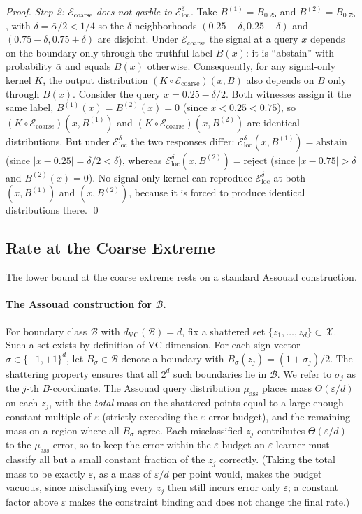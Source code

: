 \documentclass[runningheads,envcountsame]{llncs}
\newcommand{\cB}{\mathcal{B}}
\newcommand{\cX}{\mathcal{X}}
\newcommand{\cE}{\mathcal{E}}
\newcommand{\eps}{\varepsilon}
\newcommand{\dvc}{d_{\mathrm{VC}}}
\begin{document}
\begin{proof}
\emph{Step 2: $\cE_{\mathrm{coarse}}$ does not garble to $\cE_{\mathrm{loc}}^\delta$.}
Take $B^{(1)} = B_{0.25}$ and $B^{(2)} = B_{0.75}$, with $\delta = \bar\alpha/2 < 1/4$ so the $\delta$-neighborhoods $(0.25 - \delta, 0.25 + \delta)$ and $(0.75 - \delta, 0.75 + \delta)$ are disjoint. Under $\cE_{\mathrm{coarse}}$ the signal at a query $x$ depends on the boundary only through the truthful label $B(x)$: it is ``abstain'' with probability $\bar\alpha$ and equals $B(x)$ otherwise. Consequently, for any signal-only kernel $K$, the output distribution $(K \circ \cE_{\mathrm{coarse}})(x, B)$ also depends on $B$ only through $B(x)$. Consider the query $x = 0.25 - \delta/2$. Both witnesses assign it the same label, $B^{(1)}(x) = B^{(2)}(x) = 0$ (since $x < 0.25 < 0.75$), so $(K \circ \cE_{\mathrm{coarse}})(x, B^{(1)})$ and $(K \circ \cE_{\mathrm{coarse}})(x, B^{(2)})$ are identical distributions. But under $\cE_{\mathrm{loc}}^\delta$ the two responses differ: $\cE_{\mathrm{loc}}^\delta(x, B^{(1)}) = \text{abstain}$ (since $|x - 0.25| = \delta/2 < \delta$), whereas $\cE_{\mathrm{loc}}^\delta(x, B^{(2)}) = \text{reject}$ (since $|x - 0.75| > \delta$ and $B^{(2)}(x) = 0$). No signal-only kernel can reproduce $\cE_{\mathrm{loc}}^\delta$ at both $(x, B^{(1)})$ and $(x, B^{(2)})$, because it is forced to produce identical distributions there. \qed
\end{proof}

\subsection{Rate at the Coarse Extreme}
\label{sec:coarse-rate}

The lower bound at the coarse extreme rests on a standard Assouad construction.

\paragraph{The Assouad construction for $\cB$.}
\label{app:assouad-construction}
For boundary class $\cB$ with $\dvc(\cB) = d$, fix a shattered set $\{z_1, \ldots, z_d\} \subset \cX$. Such a set exists by definition of VC dimension. For each sign vector $\sigma \in \{-1, +1\}^d$, let $B_\sigma \in \cB$ denote a boundary with $B_\sigma(z_j) = (1 + \sigma_j)/2$. The shattering property ensures that all $2^d$ such boundaries lie in $\cB$. We refer to $\sigma_j$ as the $j$-th $B$-coordinate. The Assouad query distribution $\mu_{\mathrm{ass}}$ places mass $\Theta(\eps/d)$ on each $z_j$, with the \emph{total} mass on the shattered points equal to a large enough constant multiple of $\eps$ (strictly exceeding the $\eps$ error budget), and the remaining mass on a region where all $B_\sigma$ agree. Each misclassified $z_j$ contributes $\Theta(\eps/d)$ to the $\mu_{\mathrm{ass}}$-error, so to keep the error within the $\eps$ budget an $\eps$-learner must classify all but a small constant fraction of the $z_j$ correctly. (Taking the total mass to be exactly $\eps$, as a mass of $\eps/d$ per point would, makes the budget vacuous, since misclassifying every $z_j$ then still incurs error only $\eps$; a constant factor above $\eps$ makes the constraint binding and does not change the final rate.)
\end{document}

